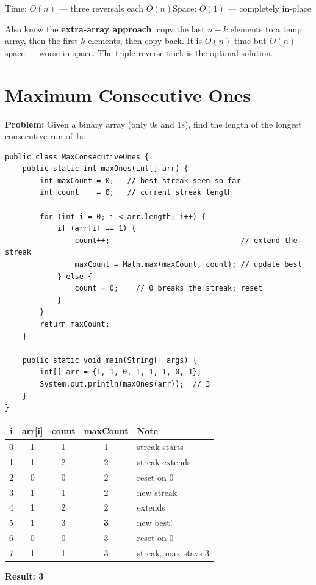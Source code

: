 \documentclass[12pt,a4paper,oneside]{book}
\begin{document}
\begin{complexity}
Time: $O(n)$ --- three reversals each $O(n)$\quad Space: $O(1)$ --- completely in-place
\end{complexity}

\begin{interviewcorner}
Also know the \textbf{extra-array approach}: copy the last $n-k$ elements to a temp array, then the first $k$ elements, then copy back. It is $O(n)$ time but $O(n)$ space --- worse in space. The triple-reverse trick is the optimal solution.
\end{interviewcorner}

\section{Maximum Consecutive Ones}

\textbf{Problem:} Given a binary array (only 0s and 1s), find the length of the longest consecutive run of 1s.

\begin{lstlisting}[caption={Maximum Consecutive Ones --- streak counter}]
public class MaxConsecutiveOnes {
    public static int maxOnes(int[] arr) {
        int maxCount = 0;   // best streak seen so far
        int count    = 0;   // current streak length

        for (int i = 0; i < arr.length; i++) {
            if (arr[i] == 1) {
                count++;                              // extend the streak
                maxCount = Math.max(maxCount, count); // update best
            } else {
                count = 0;    // 0 breaks the streak; reset
            }
        }
        return maxCount;
    }

    public static void main(String[] args) {
        int[] arr = {1, 1, 0, 1, 1, 1, 0, 1};
        System.out.println(maxOnes(arr));  // 3
    }
}
\end{lstlisting}

\begin{dryrun}[Dry Run: arr = \{1, 1, 0, 1, 1, 1, 0, 1\}]
\begin{center}
\begin{tabular}{ccccl}
\toprule
\textbf{i} & \textbf{arr[i]} & \textbf{count} & \textbf{maxCount} & \textbf{Note}\\
\midrule
0 & 1 & 1 & 1 & streak starts\\
1 & 1 & 2 & 2 & streak extends\\
2 & 0 & 0 & 2 & reset on 0\\
3 & 1 & 1 & 2 & new streak\\
4 & 1 & 2 & 2 & extends\\
5 & 1 & 3 & \textbf{3} & new best!\\
6 & 0 & 0 & 3 & reset on 0\\
7 & 1 & 1 & 3 & streak, max stays 3\\
\bottomrule
\end{tabular}
\end{center}
\textbf{Result: 3}
\end{dryrun}
\end{document}
